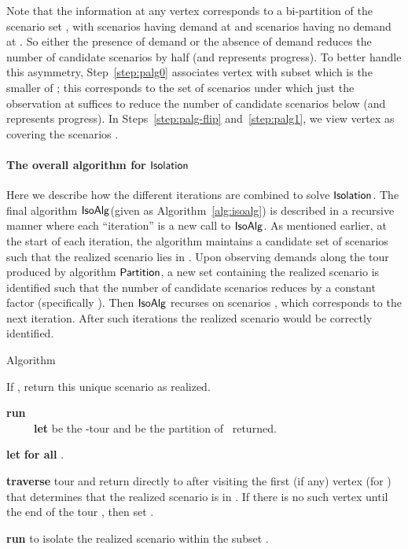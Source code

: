 \documentclass[11pt]{article}
\def\iso{\ensuremath{{\sf IsoAlg}}\xspace}
\def\palg{\ensuremath{{\sf Partition}}\xspace}
\def\isoprob{\ensuremath{{\sf Isolation}}\xspace}
\begin{document}
Note that the information at any vertex  corresponds to a bi-partition  of the scenario set
, with scenarios  having demand at  and scenarios  having no demand at . So either the
presence of demand or the absence of demand reduces the number of candidate scenarios by half (and represents progress).
To better handle this asymmetry, Step~\ref{step:palg0} associates vertex  with subset  which is the smaller of
; this corresponds to the set of scenarios under which just the observation at  suffices to 
reduce the number of candidate scenarios below  (and represents progress). In Steps~\ref{step:palg-flip} and~\ref{step:palg1}, we view vertex  as covering the
scenarios .



\paragraph{The overall algorithm for \isoprob} Here we describe how the different iterations are combined to solve \isoprob. 
The final algorithm \iso (given as Algorithm~\ref{alg:isoalg}) is described in a recursive manner where each ``iteration'' is a new call to \iso. As mentioned earlier, at the start of each iteration, the algorithm maintains a
candidate set  of scenarios such that the realized scenario lies in .  Upon observing demands along the tour
produced by algorithm \palg, 
 a new set  containing the realized scenario is 
identified such that the number of candidate scenarios reduces by a constant factor (specifically ).
Then \iso recurses on scenarios , which corresponds to the next iteration.  After  such iterations the realized scenario would be correctly
identified.

\begin{algorithm}
  \caption{Algorithm }
  \label{alg:isoalg}
  \begin{algorithmic}[1]
    \STATE If , return this unique scenario as realized.

    \STATE \label{step:iso2} \textbf{run}  \\
    ~~~~~\textbf{let}  be the -tour and
      be the partition of~ returned.

    \STATE \textbf{let}  \textbf{for all} .

    \STATE \label{step:iso3} \textbf{traverse} tour  and return
    directly to  after visiting the first (if any) vertex 
    (for ) that determines that the realized scenario is
    in . If there is no such vertex until the end of
    the tour , then set .

    \STATE  \textbf{run}  to isolate the
    realized scenario within the subset .
  \end{algorithmic}
\end{algorithm}
\end{document}
